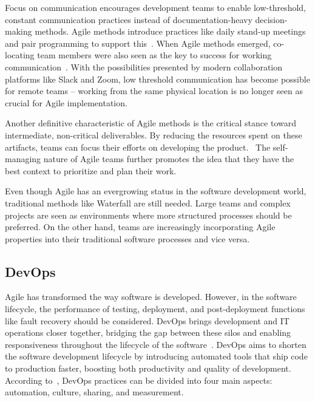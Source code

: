 Focus on communication encourages development teams to enable low-threshold, constant communication practices instead of documentation-heavy decision-making methods. Agile methods introduce practices like daily stand-up meetings and pair programming to support this~\cite{fowler_agile_2001}. When Agile methods emerged, co-locating team members were also seen as the key to success for working communication~\cite{cohen_introduction_2004}. With the possibilities presented by modern collaboration platforms like Slack and Zoom, low threshold communication has become possible for remote teams – working from the same physical location is no longer seen as crucial for Agile implementation.

Another definitive characteristic of Agile methods is the critical stance toward intermediate, non-critical deliverables. By reducing the resources spent on these artifacts, teams can focus their efforts on developing the product.~\cite{cohen_introduction_2004} The self-managing nature of Agile teams further promotes the idea that they have the best context to prioritize and plan their work.~\cite{alshamrani_comparison_2015} 

Even though Agile has an evergrowing status in the software development world, traditional methods like Waterfall are still needed. Large teams and complex projects are seen as environments where more structured processes should be preferred. On the other hand, teams are increasingly incorporating Agile properties into their traditional software processes and vice versa.~\cite{cohen_introduction_2004} 

\subsection{DevOps}

Agile has transformed the way software is developed. However, in the software lifecycle, the performance of testing, deployment, and post-deployment functions like fault recovery should be considered. DevOps brings development and IT operations closer together, bridging the gap between these silos and enabling responsiveness throughout the lifecycle of the software~\cite{hemon-hildgen_agile_2020}. DevOps aims to shorten the software development lifecycle by introducing automated tools that ship code to production faster, boosting both productivity and quality of development\cite{cois_modern_2014}. According to~\citet{humble_why_2011}, DevOps practices can be divided into four main aspects: automation, culture, sharing, and measurement. 

